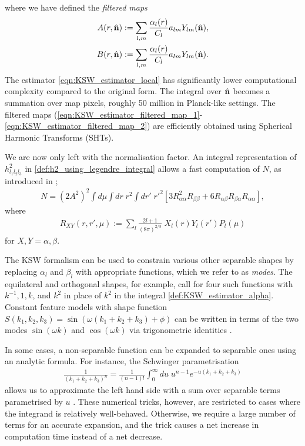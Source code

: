 where we have defined the \textit{filtered maps}
\begin{align}
	A(r,\hat{\mathbf{n}}) &:= \sum_{l,m} \frac{\alpha_l(r)}{C_l} a_{lm} Y_{lm}(\hat{\mathbf{n}}), \label{eqn:KSW_estimator_filtered_map_1}\\
	B(r,\hat{\mathbf{n}}) &:= \sum_{l,m} \frac{\alpha_l(r)}{C_l} a_{lm} Y_{lm}(\hat{\mathbf{n}}). \label{eqn:KSW_estimator_filtered_map_2}
\end{align}
The estimator \eqref{eqn:KSW_estimator_local} has significantly lower computational complexity compared to the original form. The integral over $\hat{\mathbf{n}}$ becomes a summation over map pixels, roughly 50 million in Planck-like settings. The filtered maps (\ref{eqn:KSW_estimator_filtered_map_1}-\ref{eqn:KSW_estimator_filtered_map_2}) are efficiently obtained using Spherical Harmonic Transforms (SHTs).

We are now only left with the normalisation factor. An integral representation of $h^2_{l_1 l_2 l_3}$ in \eqref{def:h2_using_legendre_integral} allows a fast computation of $N$, as introduced in \cite{Smith2011};
\begin{align}
	N = (2A^2)^2 \int d\mu \int dr \;r^2 \int dr' \; r'^2 \left[ 3R_{\alpha\alpha}^2 R_{\beta\beta} + 6R_{\alpha\beta} R_{\beta\alpha} R_{\alpha\alpha} \right],
\end{align}
where
\begin{align}
	R_{XY} (r,r',\mu) := \sum_l \frac{2l+1}{(8\pi)^{2/3}} \; X_l (r) Y_l (r') P_l(\mu)
\end{align}
for $X,Y=\alpha,\beta$.

The KSW formalism can be used to constrain various other separable shapes by replacing $\alpha_l$ and $\beta_l$ with appropriate functions, which we refer to as \textit{modes}. The equilateral and orthogonal shapes, for example, call for four such functions with $k^{-1}, 1, k$, and $k^2$ in place of $k^2$ in the integral \eqref{def:KSW_estimator_alpha}. Constant feature models with shape function $S(k_1,k_2,k_3) = \sin(\omega(k_1+k_2+k_3)+\phi)$ can be written in terms of the two modes $\sin(\omega k)$ and $\cos(\omega k)$ via trigonometric identities \cite{Munchmeyer2014}.

In some cases, a non-separable function can be expanded to separable ones using an analytic formula. For instance, the Schwinger parametrisation
\begin{align}
	\frac{1}{(k_1+k_2+k_3)^n} = \frac{1}{(n-1)!} \int_0^{\infty} du \; u^{n-1} e^{-u(k_1+k_2+k_3)}
\end{align}
allows us to approximate the left hand side with a sum over separable terms parametrised by $u$ \cite{Smith2011}. These numerical tricks, however, are restricted to cases where the integrand is relatively well-behaved. Otherwise, we require a large number of terms for an accurate expansion, and the trick causes a net increase in computation time instead of a net decrease.

